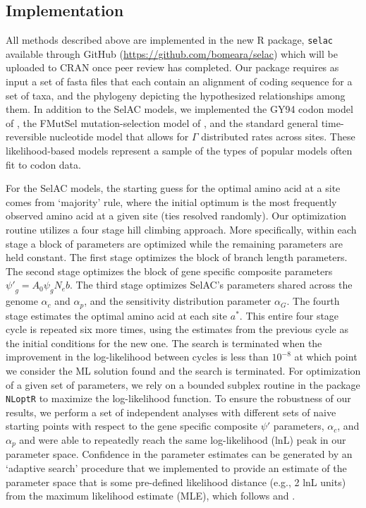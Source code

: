 \documentclass[onecolumn,letterpaper,fleqn,nogrid]{myMBE}%
\newcommand{\Ne}{\ensuremath{{N_e}}\xspace} %
\newcommand{\selac}{SelAC\xspace}
\newcommand{\alphac}{\ensuremath{\alpha_c}\xspace}
\newcommand{\alphag}{\ensuremath{\alpha_G}\xspace}
\newcommand{\alphap}{\ensuremath{\alpha_p}\xspace}
\newcommand{\aopt}{\ensuremath{a^*}\xspace}
\newcommand{\psiprime}{\ensuremath{\psi'}\xspace}
\begin{document}
\subsection{Implementation}\label{sec:implementation}
All methods described above are implemented in the new R package, \texttt{selac} available through GitHub (\url{https://github.com/bomeara/selac}) which will be uploaded to CRAN once peer review has completed.
Our package requires as input a set of fasta files that each contain an alignment of coding sequence for a set of taxa, and the phylogeny depicting the hypothesized relationships among them.
In addition to the SelAC models, we implemented the GY94 codon model of \citet{GoldmanAndYang1994}, the FMutSel mutation-selection model of \citet{YangAndNielsen2008}, and the standard general time-reversible nucleotide model that allows for $\Gamma$ distributed rates across sites.
These likelihood-based models represent a sample of the types of popular models often fit to codon data.

For the \selac models, the starting guess for the optimal amino acid at a site comes from `majority' rule, where the initial optimum is the most frequently observed amino acid at a given site (ties resolved randomly).
Our optimization routine utilizes a four stage hill climbing approach.
More specifically, within each stage a block of parameters are optimized while the remaining parameters are held constant.
The first stage optimizes the block of branch length parameters.
The second stage optimizes the block of gene specific composite parameters $ \psiprime_g = A_0 \psi_g \Ne b$.
The third stage optimizes \selac's parameters shared across the genome $\alphac$ and $\alphap$, and the sensitivity distribution parameter $\alphag$.
The fourth stage estimates the optimal amino acid at each site \aopt.
This entire four stage cycle is repeated six more times, using the estimates from the previous cycle as the initial conditions for the new one.
The search is terminated when the improvement in the log-likelihood between cycles is less than $10^{-8}$ at which point we consider the ML solution found and the search is terminated.
For optimization of a given set of parameters, we rely on a bounded subplex routine \citep{Rowan1990} in the package \texttt{NLoptR} \citep{Johnson2012} to maximize the log-likelihood function.
To ensure the robustness of our results, we perform a set of independent analyses with different sets of naive starting points with respect to the gene specific composite $\psiprime$ parameters, $\alphac$, and $\alphap$ and were able to repeatedly reach the same log-likelihood (lnL) peak in our parameter space.
Confidence in the parameter estimates can be generated by an `adaptive search' procedure that we implemented to provide an estimate of the parameter space that is some pre-defined likelihood distance (e.g., 2 lnL units) from the maximum likelihood estimate (MLE), which follows \citet{BeaulieuAndOMeara2016} and \citet{edwards1984likelihood}.
\end{document}
